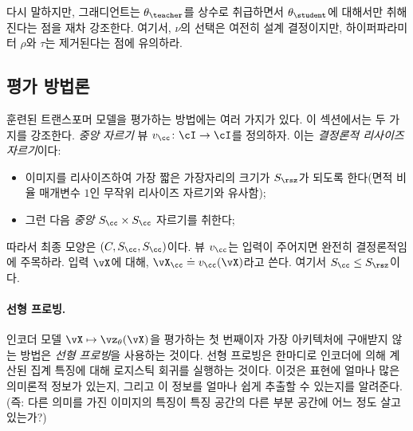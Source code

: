 \documentclass[../../book-main_ko.tex]{subfiles}
\begin{document}
다시 말하지만, 그래디언트는 \(\theta_{\teacher}\)를 상수로 취급하면서 \(\theta_{\student}\)에 대해서만 취해진다는 점을 재차 강조한다. 여기서, \(\nu\)의 선택은 여전히 설계 결정이지만, 하이퍼파라미터 \(\rho\)와 \(\tau\)는 제거된다는 점에 유의하라.

\subsection{평가 방법론}\label{sub:contrastive_learning_evals}
훈련된 트랜스포머 모델을 평가하는 방법에는 여러 가지가 있다. 이 섹션에서는 두 가지를 강조한다. \textit{중앙 자르기} 뷰 \(v_{\cc} \colon \cI \to \cI\)를 정의하자. 이는 \textit{결정론적 리사이즈 자르기}이다:
\begin{itemize}
    \item 이미지를 리사이즈하여 가장 짧은 가장자리의 크기가 \(S_{\rsz}\)가 되도록 한다(면적 비율 매개변수 \(1\)인 무작위 리사이즈 자르기와 유사함);
    \item 그런 다음 \textit{중앙} \(S_{\cc} \times S_{\cc}\) 자르기를 취한다;
\end{itemize}
따라서 최종 모양은 \((C, S_{\cc}, S_{\cc})\)이다. 뷰 \(v_{\cc}\)는 입력이 주어지면 완전히 결정론적임에 주목하라. 입력 \(\vX\)에 대해, \(\vX_{\cc} \doteq v_{\cc}(\vX)\)라고 쓴다. 여기서 \(S_{\cc} \leq S_{\rsz}\)이다.


\paragraph{선형 프로빙.}

인코더 모델 \(\vX \mapsto \vz_{\theta}(\vX)\)을 평가하는 첫 번째이자 가장 아키텍처에 구애받지 않는 방법은 \textit{선형 프로빙}을 사용하는 것이다. 선형 프로빙은 한마디로 인코더에 의해 계산된 집계 특징에 대해 로지스틱 회귀를 실행하는 것이다. 이것은 표현에 얼마나 많은 의미론적 정보가 있는지, 그리고 이 정보를 얼마나 쉽게 추출할 수 있는지를 알려준다. (즉: 다른 의미를 가진 이미지의 특징이 특징 공간의 다른 부분 공간에 어느 정도 살고 있는가?)
\end{document}
